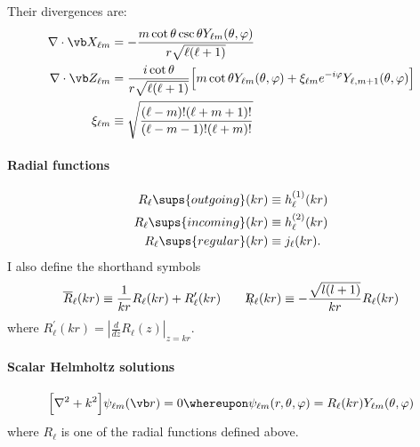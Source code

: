 \documentclass[letterpaper]{article}
\newcommand{\lm}{_{\ell m}}
\newcommand{\RBar}{\overline{R}}
\newcommand{\RSlash}{\backslash\hspace{-0.08in}R}
\begin{document}
Their divergences are:
\begin{subequations}
\begin{align}
\nabla \cdot \vb X\lm
 &=-\frac{m\cot\theta\csc\theta Y\lm(\theta,\varphi)}
         {r\sqrt{\ell(\ell+1)}}
\\
\nabla \cdot \vb Z\lm
 &= \frac{i\cot\theta}{r \sqrt{\ell(\ell+1)}}
    \Big[ m\cot\theta Y\lm(\theta, \varphi)
          + \xi\lm e^{-i\varphi}Y_{\ell,m+1}(\theta,\varphi)
    \Big]
\\
\xi\lm&\equiv\sqrt\frac{ (\ell-m)! (\ell+m+1)!}{(\ell-m-1)!(\ell+m)!}
\end{align}
\label{XZDivergences}
\end{subequations}

\paragraph{Radial functions}
\begin{align*}
 R_\ell \sups{outgoing}(kr)  &\equiv h^{(1)}_\ell(kr) \\
 R_\ell \sups{incoming}(kr)  &\equiv h^{(2)}_\ell(kr) \\
 R_\ell \sups{regular}(kr)   &\equiv j_\ell(kr).
\end{align*}
I also define the shorthand symbols
$$ \RBar_\ell(kr)
   \equiv 
   \frac{1}{kr}R_\ell(kr) + R^\prime_\ell(kr)
   \qquad
   \RSlash_\ell(kr) \equiv -\frac{\sqrt{l(l+1)}}{kr} R_\ell(kr)
$$
where $R^\prime_\ell(kr) = \left|\frac{d}{dz}R_\ell(z)\right|_{z=kr}.$

\paragraph{Scalar Helmholtz solutions}

$$ \Big[ \nabla^2 + k^2\Big]\psi\lm(\vb r) = 0
   \whereupon
   \psi\lm(r,\theta,\varphi)=R_\ell(kr) Y_{\ell m}(\theta,\varphi)
$$
where $R_\ell$ is one of the radial functions defined above.
\end{document}
